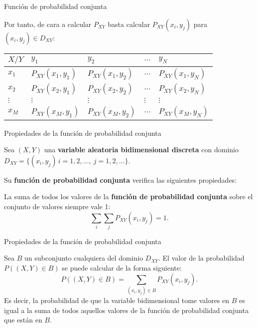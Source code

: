 \documentclass[ignorenonframetext,]{beamer}
\begin{document}
\begin{frame}{Función de probabilidad conjunta}
\protect\hypertarget{funciuxf3n-de-probabilidad-conjunta-1}{}

Por tanto, de cara a calcular \(P_{XY}\) basta calcular
\(P_{XY}(x_i,y_j)\) para \((x_i,y_j)\in D_{XY}\):

\begin{longtable}[]{@{}lllll@{}}
\toprule
\(X/Y\) & \(y_1\) & \(y_2\) & \(\ldots\) & \(y_N\)\tabularnewline
\midrule
\endhead
\(x_1\) & \(P_{XY}(x_1,y_1)\) & \(P_{XY}(x_1,y_2)\) & \(\ldots\) &
\(P_{XY}(x_1,y_N)\)\tabularnewline
\(x_2\) & \(P_{XY}(x_2,y_1)\) & \(P_{XY}(x_2,y_2)\) & \(\ldots\) &
\(P_{XY}(x_2,y_N)\)\tabularnewline
\(\vdots\) & \(\vdots\) & \(\vdots\) & \(\vdots\) &
\(\vdots\)\tabularnewline
\(x_M\) & \(P_{XY}(x_M,y_1)\) & \(P_{XY}(x_M,y_2)\) & \(\ldots\) &
\(P_{XY}(x_M,y_N)\)\tabularnewline
\bottomrule
\end{longtable}

\end{frame}

\begin{frame}{Propiedades de la función de probabilidad conjunta}
\protect\hypertarget{propiedades-de-la-funciuxf3n-de-probabilidad-conjunta}{}

Sea \((X,Y)\) una \textbf{variable aleatoria bidimensional discreta} con
dominio \(D_{XY}=\{(x_i,y_j)\, i=1,2,\ldots,\ j=1,2,\ldots\}\).

Su \textbf{función de probabilidad conjunta} verifica las siguientes
propiedades:

La suma de todos los valores de la \textbf{función de probabilidad
conjunta} sobre el conjunto de valores siempre vale 1:
\[\sum_{i}\sum_j P_{XY}(x_i,y_j)=1.\]

\end{frame}

\begin{frame}{Propiedades de la función de probabilidad conjunta}
\protect\hypertarget{propiedades-de-la-funciuxf3n-de-probabilidad-conjunta-1}{}

Sea \(B\) un subconjunto cualquiera del dominio \(D_{XY}\). El valor de
la probabilidad \(P((X,Y)\in B)\) se puede calcular de la forma
siguiente: \[
P((X,Y)\in B) =\sum_{(x_i,y_j)\in B} P_{XY}(x_i,y_j).
\] Es decir, la probabilidad de que la variable bidimensional tome
valores en \(B\) es igual a la suma de todos aquellos valores de la
función de probabilidad conjunta que están en \(B\).

\end{frame}
\end{document}
